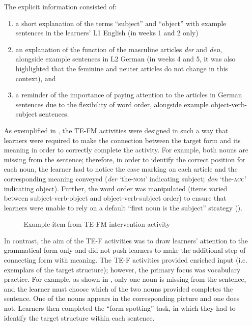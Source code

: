 \documentclass[output=paper]{langscibook}
\begin{document}
The explicit information consisted of: 

\begin{enumerate}
\item  a short explanation of the terms ``subject'' and ``object'' with example sentences in the learners’ L1 English (in weeks 1 and 2 only)
\item  an explanation of the function of the masculine articles \textit{der} and \textit{den}, alongside example sentences in L2 German (in weeks 4 and 5, it was also highlighted that the feminine and neuter articles do not change in this context), and
\item  a reminder of the importance of paying attention to the articles in German sentences due to the flexibility of word order, alongside example object-verb-subject sentences.
\end{enumerate}

As exemplified in , the TE-FM activities were designed in such a way that learners were required to make the connection between the target form and its meaning in order to correctly complete the activity. For example, both nouns are missing from the sentence; therefore, in order to identify the correct position for each noun, the learner had to notice the case marking on each article and the corresponding meaning conveyed (\textit{der} `the-\textsc{nom}' indicating subject; \textit{den} `the-\textsc{acc}' indicating object). Further, the word order was manipulated (items varied between subject-verb-object and object-verb-subject order) to ensure that learners were unable to rely on a default ``first noun is the subject'' strategy (\citealt{VanPatten2002}).



\begin{figure}
\caption{\label{fig:kasprowicz:1}Example item from TE-FM intervention activity}
\end{figure}

In contrast, the aim of the TE-F activities was to draw learners’ attention to the grammatical form only and did not push learners to make the additional step of connecting form with meaning. The TE-F activities provided enriched input (i.e. exemplars of the target structure); however, the primary focus was vocabulary practice. For example, as shown in , only one noun is missing from the sentence, and the learner must choose which of the two nouns provided completes the sentence. One of the nouns appears in the corresponding picture and one does not. Learners then completed the ``form spotting'' task, in which they had to identify the target structure within each sentence.
\end{document}
